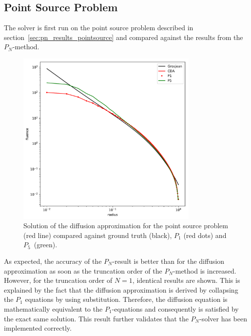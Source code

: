 \subsection{Point Source Problem}
\label{sec:da_results_pointsource}
The solver is first run on the point source problem described in section~\ref{sec:pn_results_pointsource} and compared against the results from the $P_N$-method.
\begin{figure}[h]
\centering
\includegraphics[width=0.8\textwidth]{05_diffusion_approximation/results/cda_result_plot_pointsource.pdf}
\caption{Solution of the diffusion approximation for the point source problem (red line) compared against ground truth (black), $P_1$ (red dots) and $P_5$~(green).}
\label{fig:da_results_pointsource_1}
\end{figure}

As expected, the accuracy of the $P_N$-result is better than for the diffusion approximation as soon as the truncation order of the $P_N$-method is increased. However, for the truncation order of $N=1$, identical results are shown. This is explained by the fact that the diffusion approximation is derived by collapsing the $P_1$ equations by using substitution. Therefore, the diffusion equation is mathematically equivalent to the $P_1$-equations and consequently is satisfied by the exact same solution. This result further validates that the $P_N$-solver has been implemented correctly.


